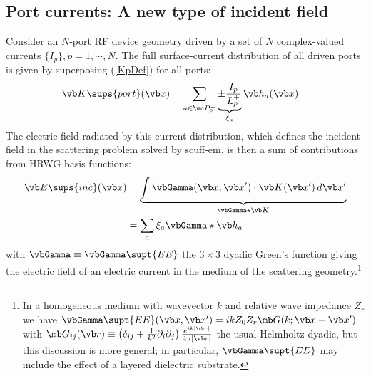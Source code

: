 \documentclass[letterpaper]{article}
\begin{document}
\subsection{Port currents: A new type of incident field}

Consider an $N$-port RF device geometry driven by a set of 
$N$ complex-valued currents $\{I_p\}, p=1,\cdots,N.$
The full surface-current distribution of all driven ports
is given by superposing (\ref{KpDef}) for all ports:
\begin{align*}
 \vb K\sups{port}(\vb x)
&= \sum_{a\in \mc P_p^\pm } 
   \underbrace{\pm \frac{I_p}{L_p^{\pm}}}_{\xi_a} \vb h_{a}(\vb x)
\end{align*}
The electric field radiated by this current distribution, which defines
the incident field in the scattering problem solved by {\sc scuff-em},
is then a sum of contributions from HRWG basis functions:
\begin{align}
  \vb E\sups{inc}(\vb x)
&=\underbrace{\int \vbGamma(\vb x, \vb x^\prime) \cdot \vb K(\vb x^\prime) \, d\vb x^\prime
             }_{\vbGamma\star \vb K}
\\
&= \sum_{a}\xi_a \vbGamma \star \vb h_a
\label{EInc}
\end{align}
with $\vbGamma\equiv \vbGamma\supt{EE}$ the $3\times 3$ dyadic Green's function
giving the electric field of an electric current in the medium
of the scattering geometry.\footnote{In a homogeneous
medium with wavevector $k$ and relative wave impedance $Z_r$ we have
$\vbGamma\supt{EE}(\vb x, \vb x^\prime)=ik Z_0 Z_r \mb G(k; \vb x-\vb x^\prime)$
with 
$\mb G_{ij}(\vb r) \equiv \left(\delta_{ij} + \frac{1}{k^2}\partial_i \partial_j\right)
 \frac{e^{ik|\vb r|}}{4\pi |\vb r|}$ the usual Helmholtz dyadic, 
but this discussion is more general; in particular, $\vbGamma\supt{EE}$ may
include the effect of a layered dielectric substrate.}
\end{document}
